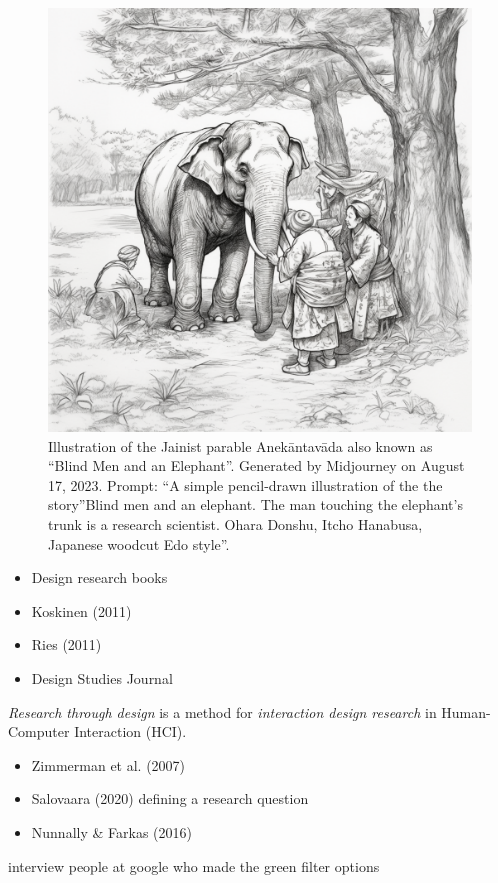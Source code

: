 \documentclass[
  letterpaper,
  DIV=11,
  numbers=noendperiod]{scrartcl}
\providecommand{\tightlist}{%
  \setlength{\itemsep}{0pt}\setlength{\parskip}{0pt}}\usepackage{longtable,booktabs,array}
\begin{document}
\begin{figure}[H]

{\centering \includegraphics[width=0.6\linewidth,height=\textheight,keepaspectratio]{./images/discussion/elephant.png}

}

\caption{Illustration of the Jainist parable Anekāntavāda also known as
``Blind Men and an Elephant''. Generated by Midjourney on August 17,
2023. Prompt: ``A simple pencil-drawn illustration of the the
story''Blind men and an elephant. The man touching the elephant's trunk
is a research scientist. Ohara Donshu, Itcho Hanabusa, Japanese woodcut
Edo style''.}

\end{figure}%

\begin{itemize}
\tightlist
\item
  Design research books
\item
  Koskinen (2011)
\item
  Ries (2011)
\item
  Design Studies Journal
\end{itemize}

\emph{Research through design} is a method for \emph{interaction design
research} in Human-Computer Interaction (HCI).

\begin{itemize}
\item
  Zimmerman et al. (2007)
\item
  Salovaara (2020) defining a research question
\item
  Nunnally \& Farkas (2016)
\end{itemize}

interview people at google who made the green filter options
\end{document}
